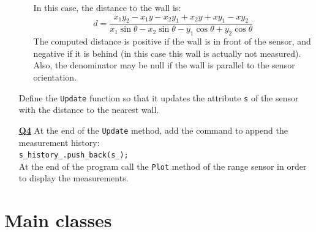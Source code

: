 \documentclass{ecnreport}
\begin{document}
\begin{itemize}
\begin{enumerate}
In this case, the distance to the wall is:
\begin{equation}
d = \frac{x_{1} y_{2} - x_{1} y - x_{2} y_{1} + x_{2} y + x y_{1} - x y_{2}}{x_{1} \sin\theta - x_{2} \sin\theta - y_{1} \cos\theta + y_{2} \cos\theta}
\end{equation}
The computed distance is positive if the wall is in front of the sensor, and negative if it is behind (in this case this wall is actually not measured). Also, the denominator may be null if the wall is parallel to the sensor orientation.
\end{enumerate}
Define the \texttt{Update} function so that it updates the attribute \texttt{s} of the sensor with the distance to the nearest wall. 

\medskip\item[\textbf{\underline{Q4}}] At the end of the \texttt{Update} method, add the command to append the measurement history: \\\texttt{s\_history\_.push\_back(s\_);}\\
At the end of the program call the \texttt{Plot} method of the range sensor in order to display the measurements.
\end{itemize}

\appendix

\section{Main classes}\label{sec:classes}
\end{document}
